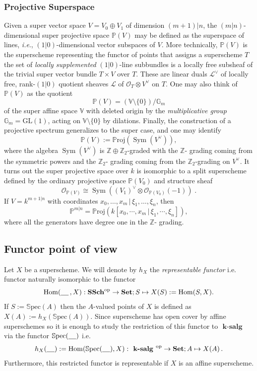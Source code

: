 \documentclass[12pt, reqno]{amsart}
\theoremstyle{plain}
\numberwithin{equation}{section}
\newcommand{\Hom}{\operatorname{Hom}\nolimits}
\newcommand{\Sym}{\operatorname{Sym}\nolimits}
\newcommand{\salg} {\textbf{ k-salg }}
\newcommand{\mc}[1]{\mathcal{#1}}
\newcommand{\Spec}[1]{\mathbb{S}\mathrm{pec}(#1)}
\newcommand{\Proj}[1]{\mathbb{P}\mathrm{roj}(#1)}
\newcommand{\SSch}{\mathbf{SSch}}
\begin{document}
\subsubsection{Projective Superspace}
Given a super vector space $V = V_0 \oplus V_1$ of dimension 
$(m+1)|n$, the $(m|n)$-dimensional super projective space 
$\mathbb{P}(V)$ may be defined as the superspace of lines, 
\emph{i.e}., $(1|0)$-dimensional vector subspaces of $V$. More 
technically, $\mathbb{P}(V)$ is the superscheme representing the 
functor of points that assigns a superscheme $T$ the set of 
\emph{locally supplemented} $(1|0)$-line subbundles is a locally free subsheaf of the trivial super vector bundle $T \times V$ 
over $T$. These are linear duals $\mc{L}^\vee$ of locally free, 
rank-$(1|0)$ quotient sheaves $\mc{L}$ of $\mc{O}_T \otimes 
V^\vee$ on $T$. One may also think of $\mathbb{P}(V)$ as the 
quotient
\[
\mathbb{P}(V) = (\mathbb{V}\setminus \{0\})/\mathbb{G}_m
\]
of the super affine space $\mathbb{V}$ with deleted origin by the 
\emph{multiplicative group} $\mathbb{G}_m = \mathrm{GL}(1)$, 
acting on $\mathbb{V}\setminus \{0\}$ by dilations. Finally, the 
construction of a projective spectrum generalizes to the super 
case, and one may identify
\[ \mathbb{P}(V) := \Proj{\Sym(V^\vee)}, \]
where the algebra $\Sym(V^\vee)$ is 
$\mathbb{Z} \oplus \mathbb{Z}_2$-graded with the $\mathbb{Z}$-
grading coming from the symmetric powers and the $\mathbb{Z}_2$-
grading coming from the $\mathbb{Z}_2$-grading on $V^\vee$. 
It turns out the super projective space over $k$ is isomorphic to 
a split superscheme defined by the ordinary projective space $
\mathbb{P}(V_0)$ and structure sheaf
\[ \mc{O}_{\mathbb{P}(V)} \cong \Sym((V_1)^\vee \otimes 
\mathcal{O}_{\mathbb{P}(V_0)}(-1))\;. \]
If $V = k^{m+1|n}$ with coordinates $x_0, \dots, x_m \, | \, 
\xi_1, \dots, \xi_n$, then 
\[ \mathbb{P}^{m|n} = \Proj{k[x_0, \cdots, x_m \, | \,  \xi_1, 
\cdots, \xi_n]}, \]
where all the generators have degree one in the $\mathbb{Z}$-
grading.

\subsection{Functor point of view}

Let $X$ be a superscheme.
We will denote by $h_X$ the \textit{representable functor} i.e. functor naturally isomorphic to the functor 
$$ 
\Hom(\underline{\hspace{0.4cm}}\,, X): \SSch^\text{op} \to \mathbf{Set}; S \mapsto X(S) := \Hom(S, X).
$$ 
If $S := \Spec{A}$ then the $A$-valued points of $X$ is defined as $X(A) := h_X(\Spec{A})$. 
Since superscheme has open cover by affine superschemes so it is enough to study the restriction of this functor to $\salg$ via the functor $\Spec{\underline{\hspace{0.4cm}}}$ i.e.
$$h_X(\underline{\hspace{0.4cm}}) := \Hom(\Spec{\underline{\hspace{0.4cm}}}, X): \salg^ \text{op} \to \mathbf{Set}; A \mapsto X(A)\,.$$
Furthermore, this restricted functor is representable if $X$ is an affine superscheme. 
\end{document}
